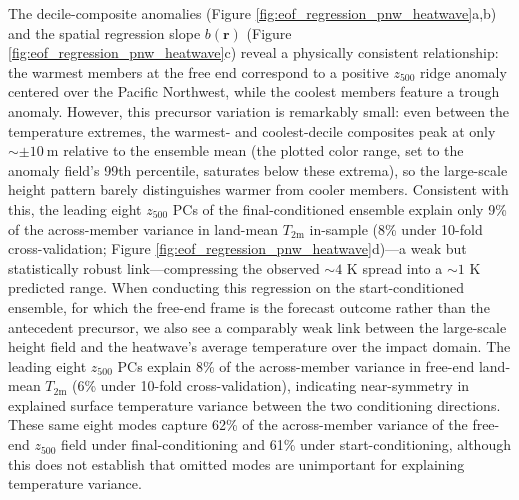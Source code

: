 \documentclass[final]{agujournal2019}
\begin{document}
The decile-composite anomalies (Figure \ref{fig:eof_regression_pnw_heatwave}a,b) and the spatial regression slope $b(\mathbf{r})$ (Figure \ref{fig:eof_regression_pnw_heatwave}c) reveal a physically consistent relationship: the warmest members at the free end correspond to a positive $z_{500}$ ridge anomaly centered over the Pacific Northwest, while the coolest members feature a trough anomaly. However, this precursor variation is remarkably small: even between the temperature extremes, the warmest- and coolest-decile composites peak at only ${\sim}{\pm}10\mathrm{~m}$ relative to the ensemble mean (the plotted color range, set to the anomaly field's 99th percentile, saturates below these extrema), so the large-scale height pattern barely distinguishes warmer from cooler members. Consistent with this, the leading eight $z_{500}$ PCs of the final-conditioned ensemble explain only 9\% of the across-member variance in land-mean $T_{\mathrm{2m}}$ in-sample (8\% under 10-fold cross-validation; Figure \ref{fig:eof_regression_pnw_heatwave}d)---a weak but statistically robust link---compressing the observed $\sim4$ K spread into a $\sim1$ K predicted range. When conducting this regression on the start-conditioned ensemble, for which the free-end frame is the forecast outcome rather than the antecedent precursor, we also see a comparably weak link between the large-scale height field and the heatwave's average temperature over the impact domain. The leading eight $z_{500}$ PCs explain 8\% of the across-member variance in free-end land-mean $T_{\mathrm{2m}}$ (6\% under 10-fold cross-validation), indicating near-symmetry in explained surface temperature variance between the two conditioning directions. These same eight modes capture 62\% of the across-member variance of the free-end $z_{500}$ field under final-conditioning and 61\% under start-conditioning, although this does not establish that omitted modes are unimportant for explaining temperature variance.
\end{document}

